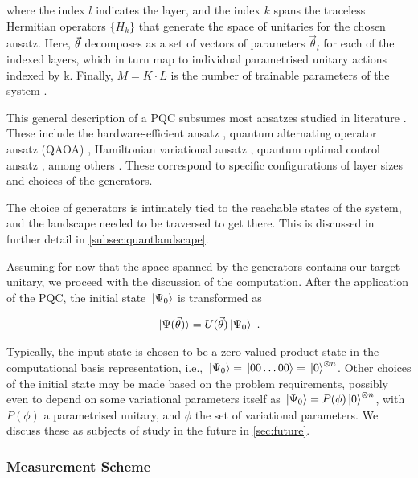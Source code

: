 where the index \(l\) indicates the layer, and the index \(k\) spans the
traceless Hermitian operators \(\{H_k\}\) that generate the space of unitaries
for the chosen ansatz. Here, \(\vec{\theta}\) decomposes as a set of vectors of
parameters \(\vec{\theta}_l\) for each of the indexed layers, which in turn map
to individual parametrised unitary actions indexed by k. Finally, \(M = K \cdot
L\) is the number of trainable parameters of the system \cite[see][section
II.A]{larocca2021theory}.

This general description of a PQC subsumes most ansatzes studied in literature
\cite{larocca2021diagnosing}. These include the hardware-efficient ansatz
\cite{kandala2017hardware}, quantum alternating operator ansatz (QAOA)
\cite{farhi2014quantum}, Hamiltonian variational ansatz
\cite{wecker2015progress}, quantum optimal control ansatz
\cite{choquette2021quantum}, among others \cite{hadfield2019quantum,
zhu2020adaptive, lee2021progress}. These correspond to specific configurations
of layer sizes and choices of the generators.

The choice of generators is intimately tied to the reachable states of the
system, and the landscape needed to be traversed to get there. This is discussed
in further detail in \autoref{subsec:quantlandscape}.

Assuming for now that the space spanned by the generators contains our target
unitary, we proceed with the discussion of the computation. After the
application of the PQC, the initial state \(\ket*{\Psi_0}\) is transformed as

\begin{gather}
    \ket*{\Psi(\vec{\theta})} = U(\vec{\theta})\ket*{\Psi_0}~.
\end{gather}

Typically, the input state is chosen to be a zero-valued product state in the
computational basis representation, i.e., \(\ket*{\Psi_0} = \ket*{00\ldots 00} =
\ket*{0}^{\otimes n}\). Other choices of the initial state may be made based on
the problem requirements, possibly even to depend on some variational parameters
itself as \(\ket*{\Psi_0} = P(\phi) \ket*{0}^{\otimes n}\), with \(P(\phi)\) a
parametrised unitary, and \(\phi\) the set of variational parameters. We discuss
these as subjects of study in the future in \autoref{sec:future}.

\subsubsection{Measurement Scheme}

